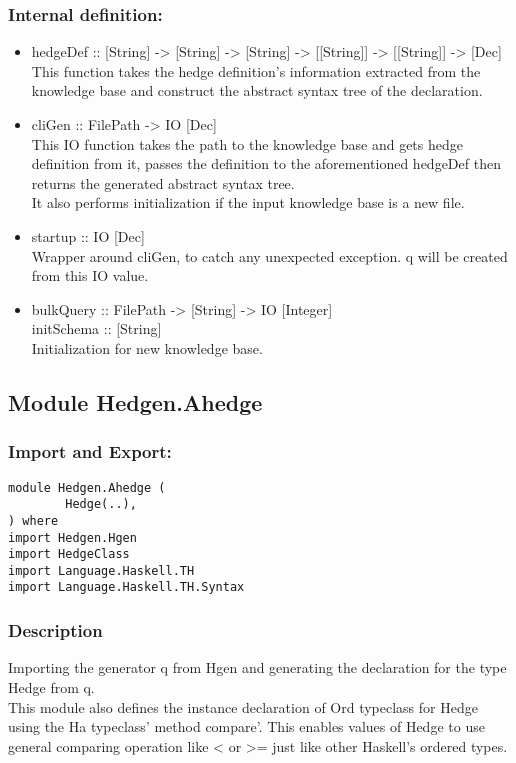 \documentclass[../gr-final.tex]{subfiles}
\begin{document}
\subsubsection{Internal definition:}
\begin{itemize}
 \item hedgeDef :: [String] -> [String] -> [String] -> [[String]] ->
         [[String]] -> [Dec]\\
         This function takes the hedge definition's information
         extracted from the knowledge base and construct the
         abstract syntax tree of the declaration.

 \item cliGen :: FilePath -> IO [Dec]\\
         This IO function takes the path to the knowledge base
         and gets hedge definition from it, passes the
         definition to the aforementioned hedgeDef then returns
         the generated abstract syntax tree.\\
         It also performs initialization if the input knowledge
         base is a new file.
 \item startup :: IO [Dec]\\
         Wrapper around cliGen, to catch any unexpected
         exception. q will be created from this IO value.

 \item bulkQuery :: FilePath -> [String] -> IO [Integer]\\
       initSchema :: [String]\\
       Initialization for new knowledge base.
\end{itemize}

\subsection{Module Hedgen.Ahedge}
\subsubsection{Import and Export:}
\begin{lstlisting}
module Hedgen.Ahedge (
        Hedge(..),
) where
import Hedgen.Hgen
import HedgeClass
import Language.Haskell.TH
import Language.Haskell.TH.Syntax
\end{lstlisting}
\subsubsection{Description} Importing the generator q from Hgen and generating the
declaration for the type Hedge from q.\\
This module also defines the instance declaration of Ord
typeclass for Hedge using the Ha typeclass' method compare'. This
enables values of Hedge to use general comparing operation like <
or >= just like other Haskell's ordered types.
\end{document}
